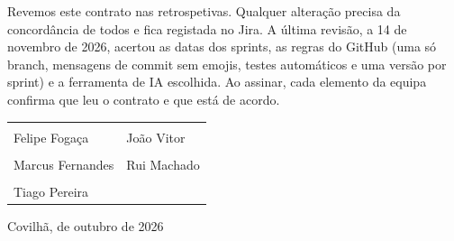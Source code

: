 \documentclass[11pt,a4paper]{article}
\begin{document}
Revemos este contrato nas retrospetivas. Qualquer alteração precisa da concordância de todos e fica registada no Jira. A última revisão, a 14 de novembro de 2026, acertou as datas dos sprints, as regras do GitHub (uma só branch, mensagens de commit sem emojis, testes automáticos e uma versão por sprint) e a ferramenta de IA escolhida. Ao assinar, cada elemento da equipa confirma que leu o contrato e que está de acordo.

\vspace{0.4em}
\begin{tabularx}{\textwidth}{Y@{\hspace{1.4cm}}Y}
  \rule{0pt}{2.6em}\hrulefill & \rule{0pt}{2.6em}\hrulefill \\
  \small Felipe Fogaça & \small João Vitor \\
  \rule{0pt}{2.6em}\hrulefill & \rule{0pt}{2.6em}\hrulefill \\
  \small Marcus Fernandes & \small Rui Machado \\
  \rule{0pt}{2.6em}\hrulefill & \\
  \small Tiago Pereira & \\
\end{tabularx}

\vspace{1.5em}
Covilhã, \underline{\hspace{1cm}} de outubro de 2026
\end{document}
